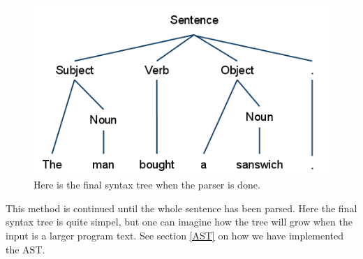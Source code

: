 \begin{figure}[H]
\begin{center}
\includegraphics[scale=0.5]{Images/parsingexample/AST5.png}
\end{center}
\caption{Here is the final syntax tree when the parser is done.}
\end{figure}

This method is continued until the whole sentence has been parsed. Here the final syntax tree is quite simpel, but one can imagine how the tree will grow when the input is a larger program text. See section \ref{AST} on how we have implemented the AST.